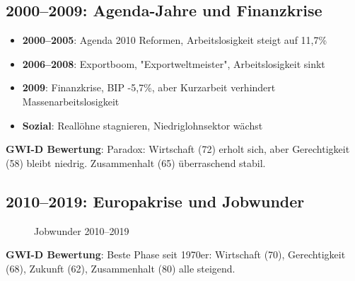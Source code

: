 \subsection{2000--2009: Agenda-Jahre und Finanzkrise}

\begin{itemize}
\item \textbf{2000--2005}: Agenda 2010 Reformen, Arbeitslosigkeit steigt auf 11,7\%
\item \textbf{2006--2008}: Exportboom, "Exportweltmeister", Arbeitslosigkeit sinkt
\item \textbf{2009}: Finanzkrise, BIP -5,7\%, aber Kurzarbeit verhindert Massenarbeitslosigkeit
\item \textbf{Sozial}: Reallöhne stagnieren, Niedriglohnsektor wächst
\end{itemize}

\textbf{GWI-D Bewertung}: Paradox: Wirtschaft (72) erholt sich, aber Gerechtigkeit (58) bleibt niedrig. Zusammenhalt (65) überraschend stabil.

\subsection{2010--2019: Europakrise und Jobwunder}

\begin{figure}[h]
\centering
{}
\caption{Jobwunder 2010--2019}
\label{fig:jobwunder-2010er}
\end{figure}

\textbf{GWI-D Bewertung}: Beste Phase seit 1970er: Wirtschaft (70), Gerechtigkeit (68), Zukunft (62), Zusammenhalt (80) alle steigend.

